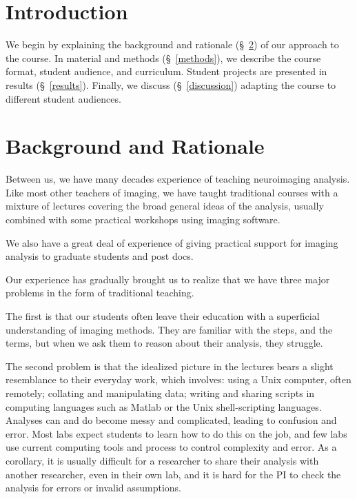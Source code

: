\section{Introduction}


We begin by explaining the background and rationale (\S~\ref{background}) of our approach to the course.
In material and methods (\S~\ref{methods}), we describe the course format, student audience,
and curriculum.
Student projects are presented in results (\S~\ref{results}).
Finally, we discuss (\S~\ref{discussion}) adapting the course to
different student audiences.

\section{Background and Rationale}\label{background}

Between us, we have many decades experience of teaching neuroimaging analysis.
Like most other teachers of imaging, we have taught traditional courses with a
mixture of lectures covering the broad general ideas of the analysis, usually
combined with some practical workshops using imaging software.

We also have a great deal of experience of giving practical support for
imaging analysis to graduate students and post docs.

Our experience has gradually brought us to realize that we have three major
problems in the form of traditional teaching.

The first is that our students often leave their education with a superficial
understanding of imaging methods.  They are familiar with the steps, and the
terms, but when we ask them to reason about their analysis, they struggle.

The second problem is that the idealized picture in the lectures bears a
slight resemblance to their everyday work, which involves: using a Unix
computer, often remotely; collating and manipulating data; writing and sharing
scripts in computing languages such as Matlab or the Unix shell-scripting
languages.  Analyses can and do become messy and complicated, leading to
confusion and error.  Most labs expect students to learn how to do this on the
job, and few labs use current computing tools and process to control 
complexity and error.  As a corollary, it is usually difficult for a
researcher to share their analysis with another researcher, even in their own
lab, and it is hard for the PI to check the analysis for errors or invalid
assumptions.

